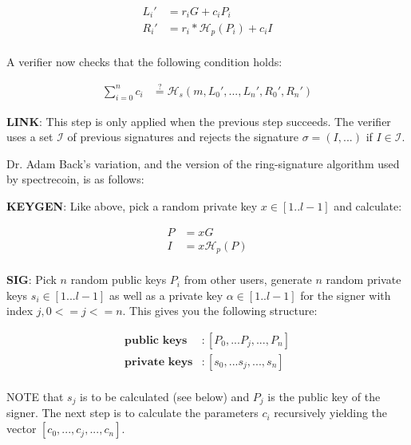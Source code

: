\begin{equation}
\begin{split}
L_i' &= r_iG+c_iP_i\\
R_i' &= r_i*\mathcal{H}_p(P_i)+c_iI\\ 
\end{split}
\end{equation}

A verifier now checks that the following condition holds:

\begin{equation}
\begin{split}
\sum_{i=0}^n c_i &\stackrel{?}{=}	 \mathcal{H}_s(m, L_0', ..., L_n', R_0', R_n')
\end{split}
\end{equation}

\hfill \break\textbf{LINK}: 
This step is only applied when the previous step succeeds. The verifier 
uses a set $\mathcal{I}$ of previous signatures and rejects the signature 
$\sigma = (I,... )$ if $I \in \mathcal{I}$.

\hfill \break Dr. Adam Back's variation, and the version of the ring-signature 
algorithm used by spectrecoin, is as follows:

\hfill \break\textbf{KEYGEN}: Like above, pick a random private key 
$x \in [1..l-1]$ and calculate:

\begin{equation}
\begin{split}
P &= xG\\
I &= x\mathcal{H}_p(P)\\ 
\end{split}
\end{equation}

\hfill \break\textbf{SIG}: Pick $n$ random public keys $P_i$ from other 
users, generate $n$ random private keys $s_i \in [1...l-1]$ as well as a 
private key $\alpha \in [1..l-1]$ for the signer with index $j, 0<=j<=n$. 
This gives you the following structure:

\begin{equation}
\begin{split}
\textbf{public keys} &: [P_0, ... P_j, ..., P_n] \\
\textbf{private keys} &: [s_0, ... s_j, ..., s_n] \\
\end{split}
\end{equation}

\hfill \break NOTE that $s_j$ is to be calculated (see below) and $P_j$ 
is the public key of the signer. The next step is to calculate the parameters 
$c_i$ recursively yielding the vector $[c_0, ... ,c_j, ..., c_n]$.

